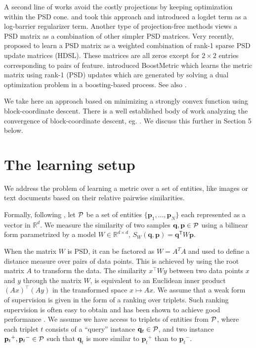 \documentclass{article} %
\newcommand\mat[1]{{#1}}
\renewcommand\vec[1]{\mathbf{#1}}
\newcommand{\T}{{}^\mathsf{T}}
\newcommand{\W}{\mat{W}}
\newcommand{\Rd}{\mathbb{R}^d}
\newcommand{\q}{{\vec{q}}}
\newcommand{\p}{{\vec{p}}}
\newcommand{\trip}{{t}}
\newcommand{\qt}{{\q_{\trip}}}
\newcommand{\pt}{{\p_{\trip}}}
\begin{document}
A second line of works avoid the costly projections by keeping optimization within the PSD cone. \citet{davis2007information} and \citet{lego} took this approach and introduced a logdet term as a log-barrier regularizer term. Another type of projection-free methods views a PSD matrix as a combination of other simpler PSD matrices. Very recently, \citet{hdsl} proposed to learn a PSD matrix as a weighted combination of rank-1 sparse PSD update matrices (HDSL). These matrices are all zeros except for $2\times2$ entries corresponding to pairs of feature. \citet{boost} introduced BoostMetric which learns the metric matrix using rank-1 (PSD) updates which are generated by solving a dual optimization problem in a boosting-based process. See also \citet{bi2011adaboost, liu2012robust}.

We take here an approach based on minimizing a strongly convex function using block-coordinate descent. There is a well established body of work analyzing the convergence of block-coordinate descent, eg. \cite{nesterov2012efficiency,richtarik2014iteration}. We discuss this further in Section 5 below.


\section{The learning setup}
We address the problem of learning a metric over a set of
entities, like images or text documents based on their
relative pairwise similarities.

Formally, following \citet{OASIS}, let $\cal{P}$ be a set of entities $\{\p_1,...,\p_N\}$ each represented as a vector in $\Rd$. We measure the similarity of two samples $\q, \p \in \cal{P}$ using a bilinear
form parametrized by a model $\W \in \mathbb{R}^{d \times d}$, $S_{\W}(\q, \p) = \q\T \W \p$.

When the matrix $\W$ is PSD, it can be factored as $\W = A^TA$ and used to define a distance measure over pairs of data points. This is achieved by using the root matrix $A$ to transform the data. The similarity $x^\top\W y$ between two data points $x$ and $y$ through the matrix $\W$, is equivalent to an Euclidean inner product  $(Ax)^\top(Ay)$ in the transformed space $x \mapsto Ax$. We assume that a weak form of supervision is given in the form of a ranking over triplets. Such ranking supervision is often easy to obtain and has been shown to achieve good performance \cite{weinberger2006dml,OASIS,qian}. We assume we have access to triplets of entities from $\cal{P}$, where each triplet $t$ consists of
a ``query'' instance $\qt \in \cal{P}$, and two instance $\pt^{+}, \pt^{-} \in \cal{P}$ such that $\qt$ is more similar to $\pt^{+}$
than to $\pt^{-}$.
\end{document}
